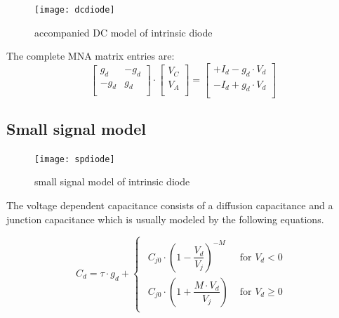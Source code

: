 \documentclass[10pt]{report}
\begin{document}
\begin{figure}[ht]
\begin{center}
\texttt{[image: dcdiode]}
\end{center}
\caption{accompanied DC model of intrinsic diode}
\label{fig:dcdiode}
\end{figure}
\FloatBarrier

The complete MNA matrix entries are:
\begin{equation}
\begin{bmatrix}
g_{d} & -g_{d}\\
-g_{d} & g_{d}\\
\end{bmatrix}
\cdot
\begin{bmatrix}
V_{C}\\
V_{A}\\
\end{bmatrix}
=
\begin{bmatrix}
+I_{d} - g_{d}\cdot V_{d}\\
-I_{d} + g_{d}\cdot V_{d}\\
\end{bmatrix}
\end{equation}

\subsection{Small signal model}

\begin{figure}[ht]
\begin{center}
\texttt{[image: spdiode]}
\end{center}
\caption{small signal model of intrinsic diode}
\label{fig:spdiode}
\end{figure}
\FloatBarrier

The voltage dependent capacitance consists of a diffusion capacitance
and a junction capacitance which is usually modeled by the following
equations.

\begin{equation}
C_{d} = \tau \cdot g_{d} +
\begin{cases}
\begin{array}{ll}
C_{j0}\cdot \left(1 - \dfrac{V_{d}}{V_{j}}\right)^{-M} & \text{ for } V_{d} < 0\\
C_{j0}\cdot \left(1 + \dfrac{M\cdot V_{d}}{V_{j}}\right) & \text{ for } V_{d} \ge 0
\end{array}
\end{cases}
\end{equation}
\end{document}
